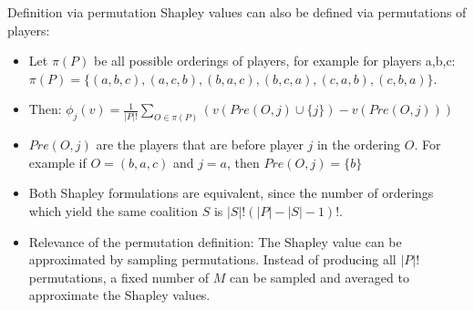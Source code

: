 \documentclass[11pt,compress,t,notes=noshow, xcolor=table]{beamer}
\begin{document}
\begin{vbframe}{Definition via permutation}
 Shapley values can also be defined via permutations of players:
\begin{itemize}
  \item Let $\pi(P)$ be all possible orderings of players, for example for players a,b,c: $\pi(P) = \{(a,b,c), (a,c,b), (b,a,c), (b,c,a), (c,a,b), (c,b,a)\}$.
  \item Then: $\phi_j(v) = \frac{1}{|P|!} \sum_{O \in \pi(P)} (v(Pre(O,j) \cup \{j\}) - v(Pre(O,j)))$
  \item $Pre(O,j)$ are the players that are before player $j$ in the ordering $O$. For example if $O = (b,a,c)$ and $j=a$, then $Pre(O,j) = \{b\}$
  \item Both Shapley formulations are equivalent, since the number of orderings which yield the same coalition $S$ is  $|S|!(|P| - |S| - 1)!$.
  \item Relevance of the permutation definition: The Shapley value can be approximated by sampling permutations. Instead of producing all $|P|!$ permutations, a fixed number of $M$ can be sampled and averaged to approximate the Shapley values.
\end{itemize}

\tiny{}

\end{vbframe}
\end{document}
